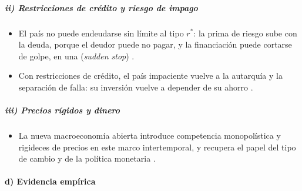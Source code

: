 \documentclass[11pt]{article}
\begin{document}
\subparagraph{ii) Restricciones de crédito y riesgo de impago}

\begin{itemize}
\item El país no puede endeudarse sin límite al tipo $r^*$: la prima de riesgo sube con la deuda, porque el deudor puede no pagar, y la financiación puede cortarse de golpe, en una  (\emph{sudden stop})\nocite{Calvo1998SuddenStops} .
\item Con restricciones de crédito, el país impaciente vuelve a la autarquía y la separación de  falla: su inversión vuelve a depender de su ahorro .
\end{itemize}

\subparagraph{iii) Precios rígidos y dinero}

\begin{itemize}
\item La nueva macroeconomía abierta introduce competencia monopolística y rigideces de precios en este marco intertemporal, y recupera el papel del tipo de cambio y de la política monetaria\nocite{ObstfeldRogoff1995Redux} .
\end{itemize}

\paragraph{d) Evidencia empírica}
\end{document}
